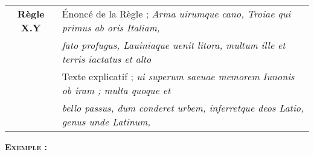 \medskip

\begin{center}
\begin{tabular}{|c l|}
\hline
\rowcolor{red!10}\textbf{Règle X.Y} & Énoncé de la Règle ; \textsl{Arma uirumque cano, Troiae qui primus ab oris Italiam,} \\
\rowcolor{red!10} & \textit{fato profugus, Lauiniaque uenit litora, multum ille et terris iactatus et alto} \\ \hline
 & Texte explicatif ; \textit{ui superum saeuae memorem Iunonis ob iram ; multa quoque et} \\
 & \textit{bello passus, dum conderet urbem, inferretque deos Latio, genus unde Latinum,} \\ \hline
\hline
\end{tabular}
\end{center}

\medskip

\begin{large}
\textbf{\textsc{Exemple :}}
\end{large}
\medskip


\bigskip

\pagebreak